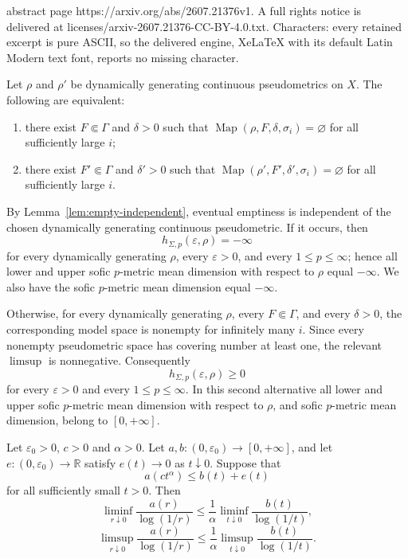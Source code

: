 \documentclass[10pt,a4paper]{amsart}
\newcommand{\Map}{\operatorname{Map}}
\begin{document}
abstract page https://arxiv.org/abs/2607.21376v1. A full rights notice is delivered at licenses/arxiv-2607.21376-CC-BY-4.0.txt. Characters: every retained excerpt is pure ASCII, so the delivered engine, XeLaTeX with its default Latin Modern text font, reports no missing character.
\begin{lemma}
\label{lem:empty-independent}
Let $\rho$ and $\rho'$ be dynamically generating continuous pseudometrics on $X$. The following are equivalent:
\begin{enumerate}[label=\textup{(\roman*)}]
 \item there exist $F\Subset\Gamma$ and $\delta>0$ such that
 $\Map(\rho,F,\delta,\sigma_i)=\varnothing$ for all sufficiently large $i$;
 \item there exist $F'\Subset\Gamma$ and $\delta'>0$ such that
 $\Map(\rho',F',\delta',\sigma_i)=\varnothing$ for all sufficiently large $i$.
\end{enumerate}
\end{lemma}

\begin{remark}\label{rem:empty-models}
By Lemma~\ref{lem:empty-independent}, eventual emptiness is independent of the chosen dynamically generating continuous pseudometric. If it occurs, then
\[
 h_{\Sigma,p}(\varepsilon,\rho)=-\infty
\]
for every dynamically generating $\rho$, every $\varepsilon>0$, and every $1\leq p\leq\infty$; hence all lower and  upper sofic $p$-metric mean dimension with respect to  $\rho$ equal $-\infty$. We also have the sofic $p$-metric mean dimension equal $-\infty$.

Otherwise, for every dynamically generating $\rho$, every $F\Subset\Gamma$, and every $\delta>0$, the corresponding model space is nonempty for infinitely many $i$. Since every nonempty pseudometric space has covering number at least one, the relevant $\limsup$ is nonnegative. Consequently
\[
 h_{\Sigma,p}(\varepsilon,\rho)\geq0
\]
for every $\varepsilon>0$ and every $1\leq p\leq\infty$. In this second alternative all lower and  upper sofic $p$-metric mean dimension with respect to  $\rho$, and sofic $p$-metric mean dimension, belong to $[0,+\infty]$.
\end{remark}

\begin{lemma}\label{lem:scale-change}
Let $\varepsilon_0>0$, $c>0$ and $\alpha>0$. Let $a,b:(0,\varepsilon_0)\to[0,+\infty]$, and let $e:(0,\varepsilon_0)\to\mathbb R$ satisfy $e(t)\to0$ as $t\downarrow0$. Suppose that
\[
 a(ct^\alpha)\leq b(t)+e(t)
\]
for all sufficiently small $t>0$. Then
\[
 \liminf_{r\downarrow0}\frac{a(r)}{\log(1/r)}
 \leq \frac1\alpha
 \liminf_{t\downarrow0}\frac{b(t)}{\log(1/t)},
\]
\[
 \limsup_{r\downarrow0}\frac{a(r)}{\log(1/r)}
 \leq \frac1\alpha
 \limsup_{t\downarrow0}\frac{b(t)}{\log(1/t)}.
\]
\end{lemma}
\end{document}
